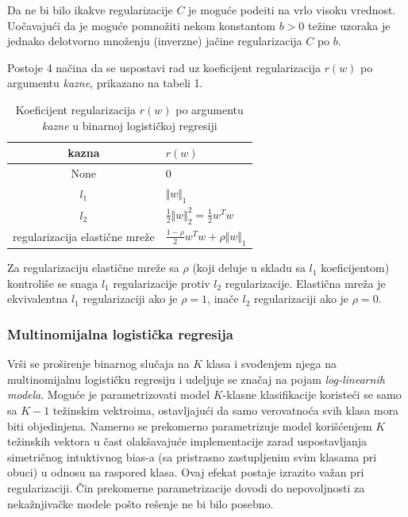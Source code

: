 \documentclass[fontsize=12bp, paper=a4]{scrarticle}
\begin{document}
Da ne bi bilo ikakve regularizacije $C$ je moguće podeiti na vrlo visoku vrednost. Uočavajući da je moguće pomnožiti nekom konstantom $b > 0$ težine uzoraka je jednako delotvorno množenju (inverzne) jačine regularizacija $C$ po $b$.

Postoje 4 načina da se uspostavi rad uz koeficijent regularizacija $r(w)$ po argumentu \textit{kazne}, prikazano na tabeli 1.
\begin{table}[h]
    \centering
    \begin{tabular}{cl}
    \toprule
    \textbf{kazna} & \textbf{$r(w)$} \\
    \midrule
    None & $0$ \\
    $l_1$ &  ${\Vert w \Vert_1}$ \\
    $l_2$ &  $\frac{1}{2}\Vert{w}\Vert_2^2 = \frac{1}{2}w^Tw$ \\
    regularizacija elastične mreže & $\frac{1 - \rho}{2}w^T w + \rho \Vert w\Vert_1$ \\
    \bottomrule
    \end{tabular}
    \caption{Koeficijent regularizacija $r(w)$ po argumentu \textit{kazne} u binarnoj logističkoj regresiji} 
\end{table}

Za regularizaciju elastične mreže sa $\rho$ (koji deluje u skladu sa $l_1$ koeficijentom) kontroliše se snaga $l_1$ regularizacije protiv $l_2$ regularizacije. Elastična mreža je ekvivalentna $l_1$ regularizaciji ako je $\rho = 1$, inače $l_2$ regularizaciji ako je $\rho = 0$.

\subsubsection{Multinomijalna logistička regresija}
Vrši se proširenje binarnog slučaja na $K$ klasa i svođenjem njega na multinomijalnu logističku regresiju i udeljuje se značaj na pojam \textit{log-linearnih modela}. Moguće je parametrizovati model $K$-klasne klasifikacije koristeći se samo sa $K-1$ težinskim  vektroima, ostavljajući da samo verovatnoća svih klasa mora biti objedinjena. Namerno se prekomerno parametrizuje model korišćenjem $K$ težinskih vektora u čast olakšavajuće implementacije zarad uspostavljanja simetričnog intuktivnog bias-a (sa pristrasno zastupljenim svim klasama pri obuci\cite{symmetry}) u odnosu na raspored klasa. Ovaj efekat postaje izrazito važan pri regularizaciji. Čin prekomerne parametrizacije dovodi do nepovoljnosti za nekažnjivačke modele pošto rešenje ne bi bilo posebno.\cite{overparametrization}
\end{document}
